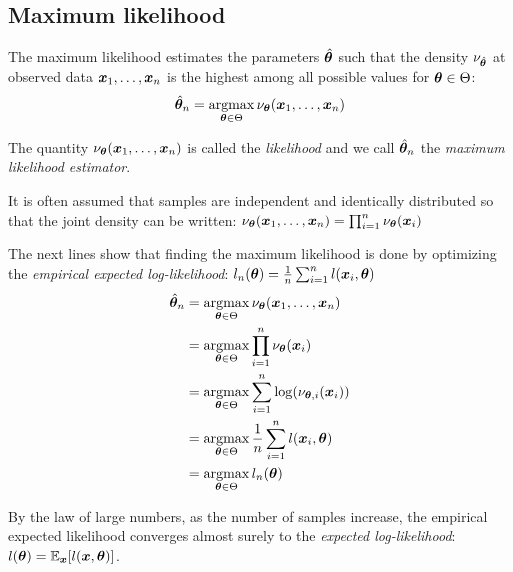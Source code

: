 \subsection{Maximum likelihood}
The maximum likelihood estimates the parameters $\hat{\boldsymbol{\theta}}$ such that the
density $\nu_{\hat{\boldsymbol{\theta}}}$ at observed data $\boldsymbol{x}_1, \dots, \boldsymbol{x}_n$ is the highest among all possible
values for $\boldsymbol{\theta} \in \Theta$:
\begin{align}
  \hat{\boldsymbol{\theta}}_n = \operatorname*{argmax}_{\boldsymbol{\theta} \in \Theta} \nu_{\boldsymbol{\theta}}(\boldsymbol{x}_1, \dots, \boldsymbol{x}_n)
\end{align}

The quantity $\nu_{\boldsymbol{\theta}}(\boldsymbol{x}_1, \dots, \boldsymbol{x}_n)$ is called the
\emph{likelihood} and we call $\hat{\boldsymbol{\theta}}_n$ the \emph{maximum likelihood estimator}.

It is often assumed that samples are independent and identically distributed so that
the joint density can be written:
$\nu_{\boldsymbol{\theta}}(\boldsymbol{x}_1, \dots, \boldsymbol{x}_n) = \prod_{i=1}^n \nu_{\boldsymbol{\theta}}(\boldsymbol{x}_i)$

The next lines show that finding the maximum likelihood is done by optimizing
the \emph{empirical expected log-likelihood}: $l_n(\boldsymbol{\theta}) = \frac1n
\sum_{i=1}^n l(\boldsymbol{x}_i, \boldsymbol{\theta})$ 
\begin{align}
  \hat{\boldsymbol{\theta}}_n &= \operatorname*{argmax}_{\boldsymbol{\theta} \in \Theta} \nu_{\boldsymbol{\theta}}(\boldsymbol{x}_1, \dots, \boldsymbol{x}_n) \\
               &= \operatorname*{argmax}_{\boldsymbol{\theta} \in \Theta} \prod_{i=1}^n \nu_{\boldsymbol{\theta}}(\boldsymbol{x}_i) \\ 
               &= \operatorname*{argmax}_{\boldsymbol{\theta} \in \Theta} \sum_{i=1}^n \log(\nu_{\boldsymbol{\theta}, i}(\boldsymbol{x}_i))  \\
               &= \operatorname*{argmax}_{\boldsymbol{\theta} \in \Theta} \frac1n \sum_{i=1}^n l(\boldsymbol{x}_i, \boldsymbol{\theta}) \\ 
                  &= \operatorname*{argmax}_{\boldsymbol{\theta} \in \Theta} l_n(\boldsymbol{\theta}) \\ 
\end{align}

By the law of large numbers, as the number of samples increase, the empirical
expected likelihood converges almost surely to the \emph{expected
  log-likelihood}: $l(\boldsymbol{\theta}) = \mathbb{E}_{\boldsymbol{x}}[l(\boldsymbol{x}, \boldsymbol{\theta})]$.


